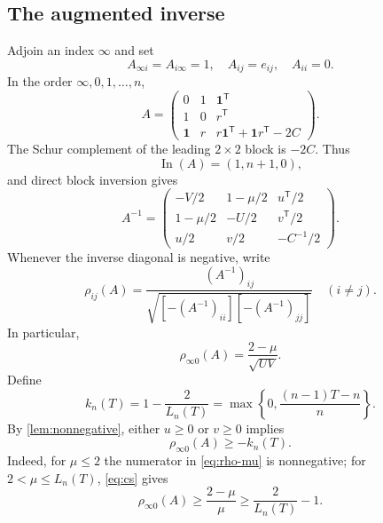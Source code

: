 \documentclass[11pt,a4paper]{article}
\theoremstyle{definition}
\theoremstyle{remark}
\numberwithin{equation}{section}
\newcommand{\one}{\mathbf 1}
\newcommand{\In}{\operatorname{In}}
\newcommand{\tr}{^{\mathsf T}}
\begin{document}
\subsection{The augmented inverse}
Adjoin an index $\infty$ and set
\begin{equation}\label{eq:augmented}
 A_{\infty i}=A_{i\infty}=1,\quad A_{ij}=e_{ij},\quad A_{ii}=0.
\end{equation}
In the order $\infty,0,1,\ldots,n$,
\[
 A=\begin{pmatrix}
 0&1&\one\tr\\
 1&0&r\tr\\
 \one&r&r\one\tr+\one r\tr-2C
 \end{pmatrix}.
\]
The Schur complement of the leading $2\times2$ block is $-2C$. Thus
\begin{equation}\label{eq:aug-inertia}
 \In(A)=(1,n+1,0),
\end{equation}
and direct block inversion gives
\begin{equation}\label{eq:aug-inverse}
 A^{-1}=\begin{pmatrix}
 -V/2&1-\mu/2&u\tr/2\\
 1-\mu/2&-U/2&v\tr/2\\
 u/2&v/2&-C^{-1}/2
 \end{pmatrix}.
\end{equation}
Whenever the inverse diagonal is negative, write
\begin{equation}\label{eq:rho}
 \rho_{ij}(A)=\frac{(A^{-1})_{ij}}
 {\sqrt{[-(A^{-1})_{ii}][-(A^{-1})_{jj}]}}\quad(i\ne j).
\end{equation}
In particular,
\begin{equation}\label{eq:rho-mu}
 \rho_{\infty0}(A)=\frac{2-\mu}{\sqrt{UV}}.
\end{equation}
Define
\begin{equation}\label{eq:kn}
 k_n(T)=1-\frac2{L_n(T)}
 =\max\left\{0,\frac{(n-1)T-n}{n}\right\}.
\end{equation}
By \cref{lem:nonnegative}, either $u\ge0$ or $v\ge0$ implies
\begin{equation}\label{eq:good-sign}
 \rho_{\infty0}(A)\ge-k_n(T).
\end{equation}
Indeed, for $\mu\le2$ the numerator in \eqref{eq:rho-mu} is nonnegative; for $2<\mu\le L_n(T)$, \eqref{eq:cs} gives
\[
 \rho_{\infty0}(A)\ge\frac{2-\mu}{\mu}\ge\frac2{L_n(T)}-1.
\]
\end{document}
